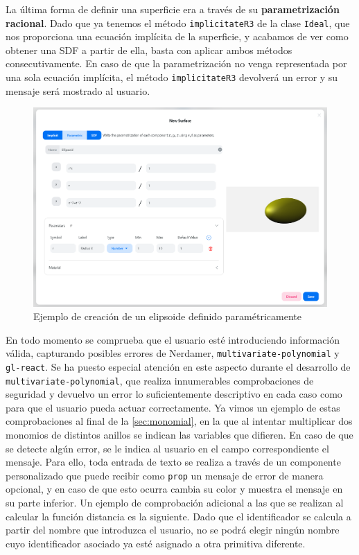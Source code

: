 La última forma de definir una superficie era a través de su \textbf{parametrización racional}. Dado que ya tenemos el método \texttt{implicitateR3} de la clase \texttt{Ideal}, que nos proporciona una ecuación implícita de la superficie, y acabamos de ver como obtener una SDF a partir de ella, basta con aplicar ambos métodos consecutivamente. En caso de que la parametrización no venga representada por una sola ecuación implícita, el método \texttt{implicitateR3} devolverá un error y su mensaje será mostrado al usuario.\newline
\begin{figure}[ht!]
    \centering
    \includegraphics[width=\textwidth]{Plantilla-TFG-master/img/ejemploParam.png}
    \caption{Ejemplo de creación de un elipsoide definido paramétricamente}
\end{figure}

En todo momento se comprueba que el usuario esté introduciendo información válida, capturando posibles errores de Nerdamer, \texttt{multivariate-polynomial} y \texttt{gl-react}. Se ha puesto especial atención en este aspecto durante el desarrollo de \texttt{multivariate-polynomial}, que realiza innumerables comprobaciones de seguridad y devuelvo un error lo suficientemente descriptivo en cada caso como para que el usuario pueda actuar correctamente. Ya vimos un ejemplo de estas comprobaciones al final de la \autoref{sec:monomial}, en la que al intentar multiplicar dos monomios de distintos anillos se indican las variables que difieren. En caso de que se detecte algún error, se le indica al usuario en el campo correspondiente el mensaje. Para ello, toda entrada de texto se realiza a través de un componente personalizado que puede recibir como \texttt{prop} un mensaje de error de manera opcional, y en caso de que esto ocurra cambia su color y muestra el mensaje en su parte inferior. Un ejemplo de comprobación adicional a las que se realizan al calcular la función distancia es la siguiente. Dado que el identificador se calcula a partir del nombre que introduzca el usuario, no se podrá elegir ningún nombre cuyo identificador asociado ya esté asignado a otra primitiva diferente.\newline


